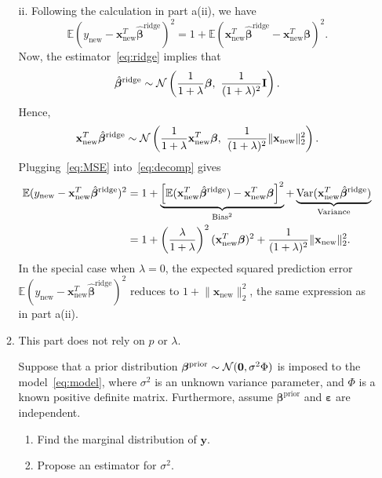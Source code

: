\documentclass[12pt]{article}
\def\mx{\mathbf{x}}
\def\my{\mathbf{y}}
\def\mI{\mathbf{I}}
\def\bbeta{{\boldsymbol{\beta}}}
\def\bepsilon{\boldsymbol{\varepsilon}}
\newcommand{\normSize}[2]{#1\lVert#2#1\rVert}
\newcommand*{\KeepStyleUnderBrace}[1]{%
  \mathop{%
    \mathchoice
    {\underbrace{\displaystyle#1}}%
    {\underbrace{\textstyle#1}}%
    {\underbrace{\scriptstyle#1}}%
    {\underbrace{\scriptscriptstyle#1}}%
  }\limits
}
\begin{document}
\begin{enumerate}
\begin{enumerate}
{ii. Following the calculation in part a(ii), we have
\begin{equation}\label{eq:decomp}
\mathbb{E}(y_{\text{new}}-\mx_{\text{new}}^T\hat \bbeta^{\text{ridge}})^2 = 1+\mathbb{E}\left(\mx_{\text{new}}^T\hat \bbeta^{\text{ridge}}-\mx_{\text{new}}^T\bbeta\right)^2.
\end{equation}
Now, the estimator~\eqref{eq:ridge} implies that
\[
\hat \bbeta^{\text{ridge}}\sim \mathcal{N}\left({1\over 1+\lambda} \bbeta,\ {1\over (1+\lambda)^2} \mI\right).
\]
Hence,
\begin{equation}\label{eq:MSE}
\mx_{\text{new}}^T\hat \bbeta^{\text{ridge}} \sim \mathcal{N}\left({1\over 1+\lambda}\mx_{\text{new}}^T\bbeta,\  {1\over (1+\lambda)^2}\normSize{}{\mx_{\text{new}}}_2^2\right).
\end{equation}
Plugging~\eqref{eq:MSE} into~\eqref{eq:decomp} gives
\begin{align}
\mathbb{E}(y_{\text{new}}-\mx_{\text{new}}^T\hat \bbeta^{\text{ridge}})^2&=1+\KeepStyleUnderBrace{\left[\mathbb{E}(\mx_{\text{new}}^T\hat \bbeta^{\text{ridge}})- \mx_{\text{new}}^T \bbeta \right]^2}_{\text{Bias}^2}+\KeepStyleUnderBrace{\text{Var}(\mx_{\text{new}}^T\hat \bbeta^{\text{ridge}})}_{\text{Variance}}\notag \\
&=1+\left({\lambda \over 1+\lambda}\right)^2(\mx_{\text{new}}^T \bbeta)^2+{1\over (1+\lambda)^2}\normSize{}{\mx_{\text{new}}}_2^2.\notag
\end{align}
In the special case when $\lambda=0$, the expected squared prediction error $\mathbb{E}(y_{\text{new}}-\mx_{\text{new}}^T\hat \bbeta^{\text{ridge}})^2$ reduces to $1+\normSize{}{\mx_{\text{new}}}_2^2$, the same expression as in part a(ii). 
}


\item This part does not rely on $p$ or $\lambda$. 


Suppose that a prior distribution $\bbeta^{\text{prior}}\sim \mathcal{N}({\bf 0},\sigma^2\Phi)$ is imposed to the model~\eqref{eq:model}, where $\sigma^2$ is an unknown variance parameter, and $\Phi$ is a known positive definite matrix. Furthermore, assume $\bbeta^{\text{prior}}$ and $\bepsilon$ are independent. 

\begin{enumerate}
\item Find the marginal distribution of $\my$.
\item Propose an estimator for $\sigma^2$.
\end{enumerate}


\end{enumerate}
\end{enumerate}
\end{document}
